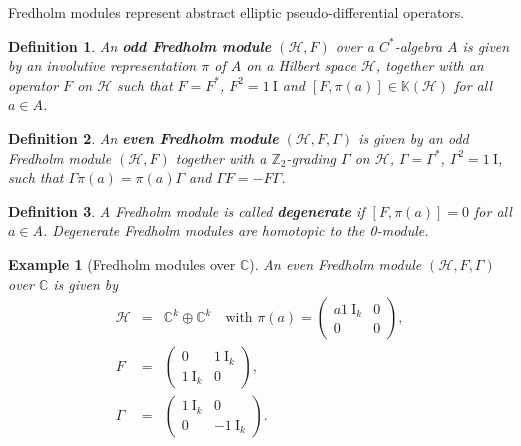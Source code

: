 \documentclass[12pt]{article}
\newcommand*{\Zset}{\mathbb{Z}}
\newcommand*{\Cset}{\mathbb{C}}
\newcommand*{\Kset}{\mathbb{K}}
\newcommand*{\identity}{\mathord{\mathrm{1\!\!\!\:I}}}
\newcommand*{\hilbert}[1][H]{\mathord{\mathcal{#1}}}
\theoremstyle{inlinedefn}
\newtheorem{definition}{Definition}
\theoremstyle{break}
\newtheorem{example}{Example}
\newcommand*{\defn}[1]{\textbf{#1}}
\begin{document}
Fredholm modules represent abstract elliptic pseudo-differential operators.

\begin{definition}
An \defn{odd Fredholm module} $(\hilbert,F)$ over a $C^*$-algebra $A$
is given by an involutive representation $\pi$ of $A$ on a Hilbert space $\hilbert$,
together with an operator $F$ on $\hilbert$ such that
$F = F^*$, $F^2 = \identity$ and $[F,\pi(a)] \in \Kset(\hilbert)$ for all $a \in A$.
\end{definition}

\begin{definition}
An \defn{even Fredholm module} $(\hilbert,F,\Gamma)$ is given by
an odd Fredholm module $(\hilbert,F)$
together with a $\Zset_2$-grading $\Gamma$ on $\hilbert$,
$\Gamma = \Gamma^*$, $\Gamma^2 = \identity$,
such that $\Gamma\pi(a) = \pi(a)\Gamma$ and $\Gamma F = -F\Gamma$.
\end{definition}

\begin{definition}
A Fredholm module is called \defn{degenerate} if $[F,\pi(a)] = 0$ for all $a \in A$.
Degenerate Fredholm modules are homotopic to the 0-module.
\end{definition}


\begin{example}[Fredholm modules over $\Cset$]
An even Fredholm module $(\hilbert,F,\Gamma)$ over $\Cset$ is given by
\begin{eqnarray*}
\hilbert & = & \Cset^k\oplus\Cset^k
\quad\mbox{with\ }
\pi(a) = \left(\begin{array}{cc}
a\identity_k & 0 \\
0 & 0 \end{array}\right), \\
F & = & \left(\begin{array}{cc}
0 & \identity_k \\
\identity_k & 0 \end{array}\right), \\
\Gamma & = & \left(\begin{array}{cc}
\identity_k & 0 \\
0 & -\identity_k \end{array}\right).
\end{eqnarray*}
\end{example}
\end{document}
